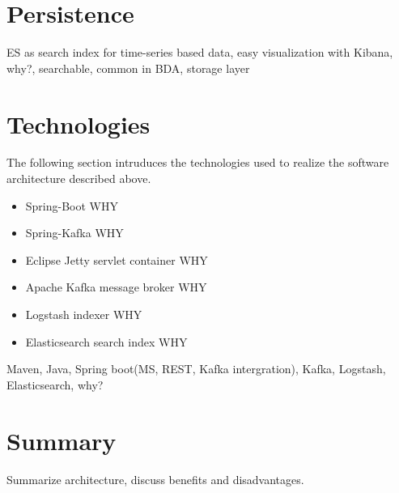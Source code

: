 \section{Persistence}

ES as search index for time-series based data, easy visualization with Kibana, why?, searchable, common in BDA, storage layer

\section{Technologies}

The following section intruduces the technologies used to realize the software architecture described above.

\begin{itemize}
	\item Spring-Boot  WHY
	\item Spring-Kafka  WHY
	\item Eclipse Jetty servlet container  WHY
	\item Apache Kafka message broker  WHY
	\item Logstash indexer  WHY
	\item Elasticsearch search index  WHY
\end{itemize}

Maven, Java, Spring boot(MS, REST, Kafka intergration), Kafka, Logstash, Elasticsearch, why?

\section{Summary}

Summarize architecture, discuss benefits and disadvantages.


